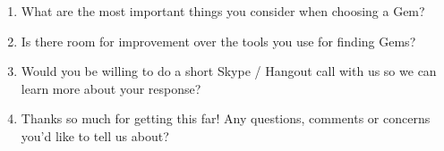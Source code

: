 \begin{enumerate}
  \item \hspace{1pt} What are the most important things you consider when choosing a Gem?

  \item \hspace{1pt} Is there room for improvement over the tools you use for finding Gems?

  \item \hspace{1pt} Would you be willing to do a short Skype / Hangout call with us so we can learn more about your response?

  \item \hspace{1pt} Thanks so much for getting this far! Any questions, comments or concerns you'd like to tell us about?

\end{enumerate}

\newpage

